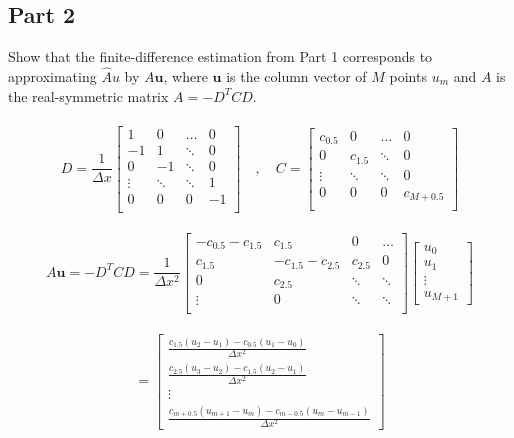 \documentclass{amsart}
\begin{document}
	\subsection{Part 2}
	Show that the finite-difference estimation from Part 1 corresponds to approximating $\hat{A}u$ by $A\mathbf{u}$, where $\mathbf{u}$ is the column vector of $M$ points $u_m$ and $A$ is the real-symmetric matrix $A = -D^TCD$.
	\\\\
	\[ D = \frac{1}{\Delta x} 
	\begin{bmatrix}
		1 		& 0		&\dots	& 0\\
		-1 		& 1 	&\ddots	& 0\\
		0 		& -1 	&\ddots & 0\\
		\vdots 	&\ddots	&\ddots	& 1\\
		0		& 0		& 0		&-1\\
	\end{bmatrix}
	\quad , \quad C =  
	\begin{bmatrix}
		c_{0.5}	& 0		& \dots	& 0 \\
		0		&c_{1.5}&\ddots	& 0 \\
		\vdots	&\ddots & \ddots& 0		\\
		0		& 0		& 0		&c_{M+0.5}\\
	\end{bmatrix}
	\]
	\\
	\[
	A\mathbf{u} = -D^TCD = \frac{1}{\Delta x^2}
	\begin{bmatrix}
		-c_{0.5} - c_{1.5} & c_{1.5} & 0 & \dots\\
		c_{1.5} & -c_{1.5} - c_{2.5} & c_{2.5} & 0\\
		0 & c_{2.5} &\ddots &\ddots \\
		\vdots & 0 & \ddots &\ddots \\
	\end{bmatrix}
	\begin{bmatrix}
		u_0\\ u_1\\ \vdots \\u_{M+1}
	\end{bmatrix}
	\]
	\\
	\[ = 
	\begin{bmatrix}
		\frac{c_{1.5}(u_{2} - u_1) - c_{0.5}(u_1 - u_0)}{\Delta x^2}\\
		\frac{c_{2.5}(u_{3} - u_2) - c_{1.5}(u_2 - u_{1})}{\Delta x^2}\\
		\vdots\\
		\frac{c_{m+0.5}(u_{m+1} - u_m) - c_{m-0.5}(u_m - u_{m-1})}{\Delta x^2}
	\end{bmatrix}
	\]
	\\\\
\end{document}
